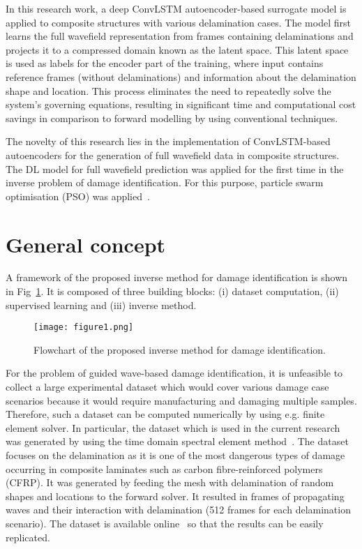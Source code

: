In this research work, a deep ConvLSTM autoencoder-based surrogate model is  applied to composite structures with various delamination cases. 
The model first learns the full wavefield representation from frames containing delaminations and projects it to a compressed domain known as the latent space. 
This latent space is used as labels for the encoder part of the training, where input contains reference frames (without delaminations) and information about the delamination shape and location. 
This process eliminates the need to repeatedly solve the system's governing equations, resulting in significant time and computational cost savings in comparison to forward modelling by using conventional techniques.

The novelty of this research lies in the implementation of ConvLSTM-based autoencoders for the generation of full wavefield data in composite structures.
The DL model for full wavefield prediction was applied for the first time in the inverse problem of damage identification.
For this purpose, particle swarm optimisation (PSO) was applied~\cite{Keneddy1995}.
\section{General concept}
A framework of the proposed inverse method for damage identification is shown in Fig~\ref{fig:complete_flowchart}.
It is composed of three building blocks: (i) dataset computation, (ii) supervised learning and (iii) inverse method.

\begin{figure} [h!]
	\begin{center}
		\texttt{[image: figure1.png]}
	\end{center}
	\caption{Flowchart of the proposed inverse method for damage identification.} 
	\label{fig:complete_flowchart}
\end{figure}

For the problem of guided wave-based damage identification, it is unfeasible to collect a large experimental dataset which would cover various damage case scenarios because it would require manufacturing and damaging multiple samples.
Therefore, such a dataset can be computed numerically by using e.g. finite element solver.
In particular, the dataset which is used in the current research was generated by using the time domain spectral element method~\cite{Kudela2020}.
The dataset focuses on the delamination as it is one of the most dangerous types of damage occurring in composite laminates such as carbon fibre-reinforced polymers (CFRP).
It was generated by feeding the mesh with delamination of random shapes and locations to the forward solver.
It resulted in frames of propagating waves and their interaction with delamination (512 frames for each delamination scenario).
The dataset is available online~\cite{kudela_pawel_2021_5414555} so that the results can be easily replicated.

